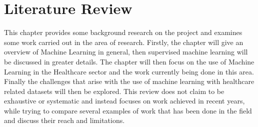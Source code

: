 \chapter{Literature Review}\label{ch:Background}

This chapter provides some background research on the project and examines some work carried out in the area of research. Firstly, the chapter will give an overview of Machine Learning in general, then supervised machine learning will be discussed in greater details. The chapter will then focus on the use of Machine Learning in the Healthcare sector and the work currently being done in this area. Finally the challenges that arise with the use of machine learning with healthcare related datasets will then be explored. This review does not claim to be exhaustive or systematic and instead focuses on work achieved in recent years, while trying to compare several examples of work that has been done in the field and discuss their reach and limitations.

